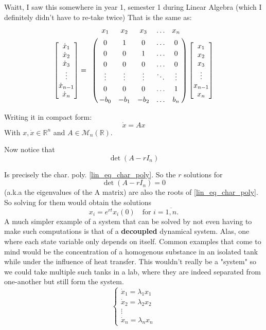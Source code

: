 Waitt, I saw this somewhere in year 1, semester 1 during Linear Algebra (which I definitely didn't have to re-take twice)
That is the same as:
\begin{align*}
	\begin{bmatrix}
		\dot{x}_1     \\
		\dot{x}_2     \\
		\dot{x}_3     \\
		\vdots        \\
		\dot{x}_{n-1} \\
		\dot{x}_n
	\end{bmatrix} =
	\bordermatrix{ & x_1    & x_2    & x_3    & \ldots & x_n \cr
		& 0      & 1      & 0      & \ldots & 0 \cr
		& 0      & 0      & 1      & \ldots & 0 \cr
		& 0      & 0      & 0      & \ldots & 0 \cr
		& \vdots & \vdots & \vdots & \ddots & \vdots \cr
		& 0      & 0      & 0      & \ldots & 1 \cr
	& -b_0   & -b_1   & -b_2   & \ldots & b_n }
	\begin{bmatrix}
		x_1     \\
		x_2     \\
		x_3     \\
		\vdots  \\
		x_{n-1} \\
		x_n
	\end{bmatrix}
\end{align*}

Writing it in compact form:
\[
	\dot{x} = A x
\]
With $x, \dot{x} \in \mathbb{R}^n$ and $A \in \mathcal{M}_n(\mathbb{R})$.

Now notice that
\[
	\det (A- r I_n)
\]

Is precisely the char. poly. \ref{lin_eq_char_poly}. So the $r$ solutions for
\[
	\det (A - r I_n) =0
\]
(a.k.a the eigenvalues of the A matrix) are also the roots of \ref{lin_eq_char_poly}. So solving for them would obtain the solutions
\[
	x_i = e^{rt}x_i(0) \quad \text{for  } i = \overline{1,n}.
\]
A much simpler example of a system that can be solved by not even having to make such computations is that of a \textbf{decoupled} dynamical system. Alas, one where each state variable only depends on itself. Common examples that come to mind would be the concentration of a homogenous substance in an isolated tank while under the influence of heat transfer. This wouldn't really be a "system" so we could take multiple such tanks in a lab, where they are indeed separated from one-another but still form the system.
\begin{equation*}
	\begin{cases}
		\dot{x}_1 = \lambda_1 x_1 \\
		\dot{x}_2 = \lambda_2 x_2 \\
		\vdots                    \\
		\dot{x}_n = \lambda_n x_n
	\end{cases}
\end{equation*}

